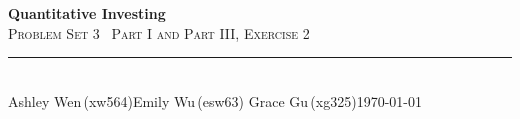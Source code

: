 \documentclass[11pt]{article}
\begin{document}
\thispagestyle{empty}
\begin{flushleft}
{\bfseries\LARGE\color{psink} Quantitative Investing}\\[3pt]
{\scshape\Large\color{psink} Problem Set 3 \textemdash\ Part I and Part III, Exercise 2}\\[10pt]
{\color{psrule}\rule{\textwidth}{1.2pt}}\\[5pt]
{\small Ashley Wen\,(xw564)\quad\textbar\quad Emily Wu\,(esw63)%
\quad\textbar\quad Grace Gu\,(xg325)\hfill \today}
\end{flushleft}

\vspace{1.2em}




\end{document}
